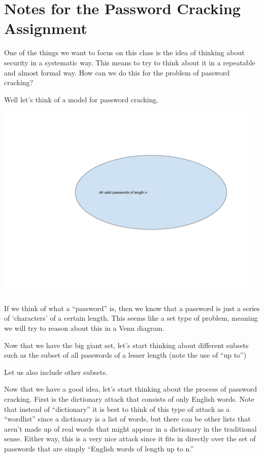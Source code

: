 \chapter{Notes for the Password Cracking Assignment}

One of the things we want to focus on this class is the idea of thinking about security in a systematic way. This means to try to think about it in a repeatable and almost formal way. How can we do this for the problem of password cracking? 

Well let’s think of a model for password cracking.

\includegraphics[width=5in]{Assignments/images/PasswordCracking_1}

If we think of what a “password” is, then we know that a password is just a series of ‘characters’ of a certain length. This seems like a set type of problem, meaning we will try to reason about this in a Venn diagram.

Now that we have the big giant set, let’s start thinking about different subsets such as the subset of all passwords of a lesser length (note the use of “up to”)

Let us also include other subsets.

Now that we have a good idea, let’s start thinking about the process of password cracking. First is the dictionary attack that consists of only English words. Note that instead of “dictionary” it is best to think of this type of attack as a “wordlist” since a dictionary is a list of words, but there can be other lists that aren’t made up of real words that might appear in a dictionary in the traditional sense. Either way, this is a very nice attack since it fits in directly over the set of passwords that are simply “English words of length up to n.”

